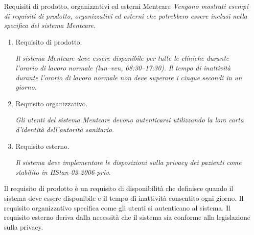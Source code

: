 \begin{Example}{Requisiti di prodotto, organizzativi ed esterni Mentcare}{}
\textit{Vengono mostrati esempi di requisiti di prodotto, organizzativi ed esterni che potrebbero essere inclusi nella specifica del sistema Mentcare.}

\begin{enumerate}
    \item Requisito di prodotto. 
    \begin{center}
        \begin{minipage}{0.9\textwidth}
        \textit{Il sistema Mentcare deve essere disponibile per tutte le cliniche durante l'orario di lavoro normale (lun–ven, 08:30–17:30). Il tempo di inattività durante l'orario di lavoro normale non deve superare i cinque secondi in un giorno.}
    \end{minipage}
    \end{center}
    \item Requisito organizzativo.
    \begin{center}
        \begin{minipage}{0.9\textwidth}
        \textit{Gli utenti del sistema Mentcare devono autenticarsi utilizzando la loro carta d'identità dell'autorità sanitaria.}
    \end{minipage}
    \end{center}
    \item Requisito esterno.
    \begin{center}
        \begin{minipage}{0.9\textwidth}
        \textit{Il sistema deve implementare le disposizioni sulla privacy dei pazienti come stabilito in HStan-03-2006-priv.}
    \end{minipage}
    \end{center}
\end{enumerate}

Il requisito di prodotto è un requisito di disponibilità che definisce quando il sistema deve essere disponibile e il tempo di inattività consentito ogni giorno. Il requisito organizzativo specifica come gli utenti si autenticano al sistema. Il requisito esterno deriva dalla necessità che il sistema sia conforme alla legislazione sulla privacy.
\end{Example}

